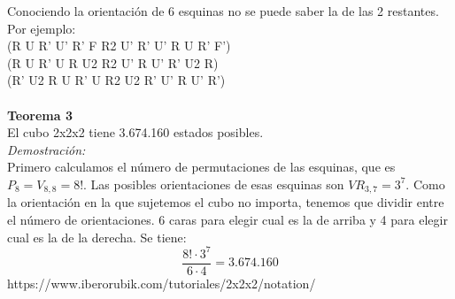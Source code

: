 \documentclass{article}
\begin{document}
Conociendo la orientación de 6 esquinas no se puede saber la de las 2 restantes. Por ejemplo:\\
(R U R' U' R' F R2 U' R' U' R U R' F')\\
(R U R' U R U2 R2 U' R U' R' U2 R)\\
(R' U2 R U R' U R2 U2 R' U' R U' R') \dag\\\\
\textbf{Teorema 3}\\
El cubo 2x2x2 tiene 3.674.160 estados posibles.\\
\textit{Demostración:}\\
Primero calculamos el número de permutaciones de las esquinas, que es $P_8 = V_{8,8} = 8!$. Las posibles orientaciones de esas esquinas son $VR_{3,7}=3^7$. Como la orientación en la que sujetemos el cubo no importa, tenemos que dividir entre el número de orientaciones. 6 caras para elegir cual es la de arriba y 4 para elegir cual es la de la derecha. Se tiene:
$$
\frac{8! \cdot 3^7}{6 \cdot 4} = 3.674.160
$$
\dag https://www.iberorubik.com/tutoriales/2x2x2/notation/
\end{document}
